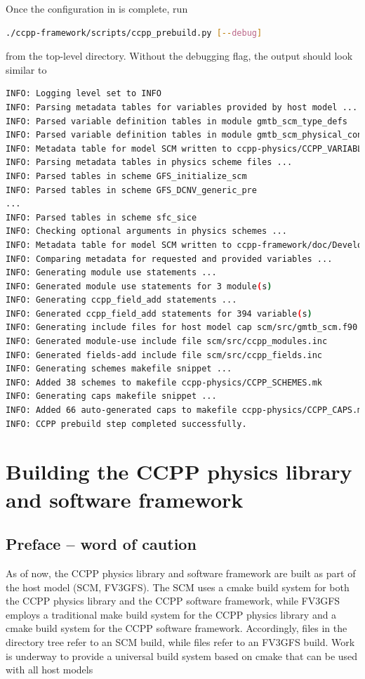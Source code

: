 Once the configuration in  is complete, run
\begin{lstlisting}[language=bash]
./ccpp-framework/scripts/ccpp_prebuild.py [--debug]
\end{lstlisting}
from the top-level directory. Without the debugging flag, the output should look similar to
\begin{lstlisting}[language=bash,basicstyle=\scriptsize\ttfamily]
INFO: Logging level set to INFO
INFO: Parsing metadata tables for variables provided by host model ...
INFO: Parsed variable definition tables in module gmtb_scm_type_defs
INFO: Parsed variable definition tables in module gmtb_scm_physical_constants
INFO: Metadata table for model SCM written to ccpp-physics/CCPP_VARIABLES.html
INFO: Parsing metadata tables in physics scheme files ...
INFO: Parsed tables in scheme GFS_initialize_scm
INFO: Parsed tables in scheme GFS_DCNV_generic_pre
...
INFO: Parsed tables in scheme sfc_sice
INFO: Checking optional arguments in physics schemes ...
INFO: Metadata table for model SCM written to ccpp-framework/doc/DevelopersGuide/CCPP_VARIABLES.tex
INFO: Comparing metadata for requested and provided variables ...
INFO: Generating module use statements ...
INFO: Generated module use statements for 3 module(s)
INFO: Generating ccpp_field_add statements ...
INFO: Generated ccpp_field_add statements for 394 variable(s)
INFO: Generating include files for host model cap scm/src/gmtb_scm.f90 ...
INFO: Generated module-use include file scm/src/ccpp_modules.inc
INFO: Generated fields-add include file scm/src/ccpp_fields.inc
INFO: Generating schemes makefile snippet ...
INFO: Added 38 schemes to makefile ccpp-physics/CCPP_SCHEMES.mk
INFO: Generating caps makefile snippet ...
INFO: Added 66 auto-generated caps to makefile ccpp-physics/CCPP_CAPS.mk
INFO: CCPP prebuild step completed successfully.
\end{lstlisting}

\section{Building the CCPP physics library and software framework}
\label{sec_ccpp_build}
\subsection{Preface -- word of caution}
As of now, the CCPP physics library and software framework are built as part of the host model (SCM, FV3GFS). The SCM uses a cmake build system for both the CCPP physics library and the CCPP software framework, while FV3GFS employs a traditional make build system for the CCPP physics library and a cmake build system for the CCPP software framework. Accordingly,  files in the  directory tree refer to an SCM build, while  files refer to an FV3GFS build. Work is underway to provide a universal build system based on cmake that can be used with all host models

